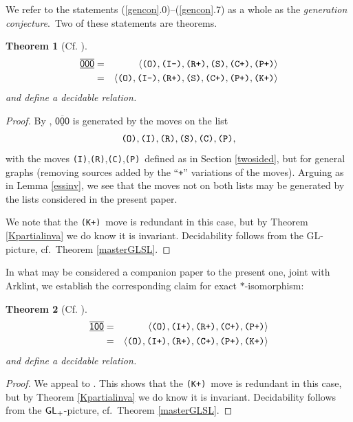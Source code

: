 \documentclass[12pt]{amsbook}%
\newtheorem{theor}{Theorem}[section]
\theoremstyle{defin}
\theoremstyle{remark}
\numberwithin{equation}{chapter}
\numberwithin{theor}{section}
\newcommand{\xyzrel}[1]{\mbox{$\overline{\underline{\mathsf{ #1}}}$}}
\newcommand{\III}{\mbox{\texttt{\textup{(I)}}}}
\newcommand{\IIIm}{\mbox{\texttt{\textup{(I-)}}}}
\newcommand{\IIIp}{\mbox{\texttt{\textup{(I+)}}}}
\newcommand{\OOO}{\mbox{\texttt{\textup{(O)}}}}
\newcommand{\CCC}{\mbox{\texttt{\textup{(C)}}}}
\newcommand{\CCCp}{\mbox{\texttt{\textup{(C+)}}}}
\newcommand{\RRR}{\mbox{\texttt{\textup{(R)}}}}
\newcommand{\RRRp}{\mbox{\texttt{\textup{(R+)}}}}
\newcommand{\PPP}{\mbox{\texttt{\textup{(P)}}}}
\newcommand{\PPPp}{\mbox{\texttt{\textup{(P+)}}}}
\newcommand{\KKKp}{\mbox{\texttt{\textup{(K+)}}}}
\newcommand{\SSS}{\mbox{\texttt{\textup{(S)}}}}
\newcommand{\standard}{\mathsf{std}}
\newcommand{\GL}{{\sf GL}}
\newcommand{\GLp}{\mbox{${\sf GL}_+$}}
\begin{document}
We refer to the statements (\ref{gencon}.0)--(\ref{gencon}.7) as a whole as the \emph{generation conjecture}.\ Two of these statements are theorems. %

\begin{theor}[Cf. \cite{segrerapws:ccuggs}]\label{OOO-done}
\begin{eqnarray*}
\xyzrel{000}&=&\langle \OOO,\IIIm,\RRRp,\SSS,\CCCp,\PPPp\rangle\\
&=&\langle \OOO,\IIIm,\RRRp,\SSS,\CCCp,\PPPp,\KKKp\rangle
\end{eqnarray*}
and define a decidable relation.
\end{theor}
\begin{proof}
By \cite[Theorem~3.1]{segrerapws:ccuggs}, $\xyzrel{000}$ is generated by the moves on the list
\[
\OOO,\III,\RRR,\SSS,\CCC,\PPP,
\]
with the moves \III,\RRR,\CCC,\PPP\ defined as in Section \ref{twosided}, but for general graphs (removing sources added by the ``{\mbox{\texttt{\textup{+}}}}'' variations of the moves). Arguing as in Lemma \ref{essinv}, we see  that the moves not on both lists may be generated by the lists considered in the present paper.

We note that the \KKKp\ move is redundant in this case, but by Theorem \ref{Kpartialinva} we do know it is invariant. Decidability follows from the \GL-picture, cf.~Theorem \ref{masterGLSL}.
\end{proof}



In what may be considered a companion paper to the present one, joint with Arklint, we establish the corresponding claim for exact $*$-isomorphism:

\begin{theor}[Cf. \cite{seaseer:gciugc}]\label{IOO-done}
\begin{eqnarray*}
\xyzrel{100}&=&\langle \OOO,\IIIp,\RRRp,\CCCp,\PPPp\rangle\\
&=&\langle \OOO,\IIIp,\RRRp,\CCCp,\PPPp,\KKKp\rangle
\end{eqnarray*}
and define a decidable relation.
\end{theor}
\begin{proof}
We appeal to \cite[Corollary 5.6]{seaseer:gciugc}. This shows that the \KKKp\ move is redundant in this case, but by Theorem \ref{Kpartialinva} we do know it is invariant. Decidability follows from the \GLp-picture, cf.~Theorem \ref{masterGLSL}.
\end{proof}
\end{document}
